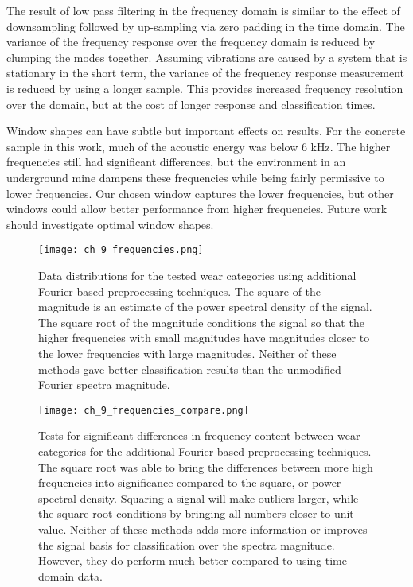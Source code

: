 The result of low pass filtering in the frequency domain is similar
to the effect of downsampling followed by up-sampling 
via zero padding in the time domain. 
The variance of the 
frequency response over the frequency domain is reduced by clumping
the modes together.
Assuming vibrations are caused by a system that is 
stationary in the short term, the variance of the frequency 
response measurement is reduced by using a longer sample.
This provides increased frequency resolution over the domain,
but at the cost of longer response and classification times.

Window shapes can have subtle but important effects on results.
For the concrete sample in this work, much of the acoustic energy was
below 6 kHz. The higher frequencies still had significant differences,
but the environment in an underground mine dampens these frequencies while
being fairly permissive to lower frequencies. 
Our chosen window captures the lower frequencies, but other windows
could allow better performance from higher frequencies.
Future work should investigate optimal window shapes.

\begin{figure}[t]
\centering
\texttt{[image: ch\_9\_frequencies.png]}
\caption{
Data distributions for the tested wear categories using additional Fourier based preprocessing techniques.
The square of the magnitude is an estimate of the power spectral density of the signal.
The square root of the magnitude conditions the signal so that the higher frequencies with small magnitudes
have magnitudes closer to the lower frequencies with large magnitudes.
Neither of these methods gave better classification results than the unmodified Fourier spectra magnitude.
}
\label{fig:basis}
\end{figure}

\begin{figure}[h]
\centering
\texttt{[image: ch\_9\_frequencies\_compare.png]}
\caption{
Tests for significant differences in frequency content between wear categories for the additional 
Fourier based preprocessing techniques. The square root was able to bring the differences between 
more high frequencies into significance compared to the square, or power spectral density. 
Squaring a signal will make outliers larger, while the square root conditions by bringing all numbers closer to unit value.
Neither of these methods adds more information or improves the signal basis for classification over the spectra magnitude. 
However, they do perform much better compared to using time domain data.
}
\label{fig:basis_compare}
\end{figure}

